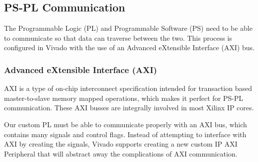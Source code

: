 \subsection{PS-PL Communication} \label{ssec:ps_pl}
The Programmable Logic (PL) and Programmable Software (PS) need to be able to communicate so that data can traverse between the two. This process is configured in Vivado with the use of an Advanced eXtensible Interface (AXI) bus.

\subsubsection{Advanced eXtensible Interface (AXI)}
AXI is a type of on-chip interconnect specification intended for transaction based master-to-slave memory mapped operations, which makes it perfect for PS-PL communication. These AXI busses are integrally involved in most Xilinx IP cores.
\par
Our custom PL must be able to communicate properly with an AXI bus, which contains many signals and control flags. Instead of attempting to interface with AXI by creating the signals, Vivado supports creating a new custom IP AXI Peripheral that will abstract away the complications of AXI communication.

